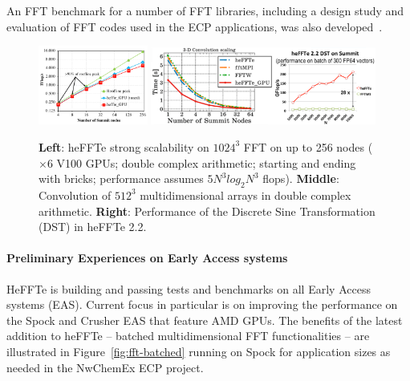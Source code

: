 An FFT benchmark for a number of FFT libraries, including a design study and evaluation of FFT 
codes used in the ECP applications, was also developed~\cite{fftbenchmark}.

\begin{figure}[htb]
   \centering
   \includegraphics[width=0.32\textwidth]{projects/2.3.3-MathLibs/2.3.3.13-CLOVER/heFFTeStrongScalability}
   \includegraphics[width=0.66\textwidth]{projects/2.3.3-MathLibs/2.3.3.13-CLOVER/heffte_conv_dst}
    \caption{\label{fig:fft-ecp-progress}
    {\bf Left}: heFFTe strong scalability on $1024^3$ 
                FFT on up to 256 nodes ($\times 6$ V100 GPUs;
                double complex arithmetic; starting and ending with bricks; 
                performance assumes $5 N^3 log_2 N^3$ flops).
    {\bf Middle}: Convolution of $512^3$ multidimensional arrays in double complex arithmetic.
    {\bf Right}: Performance of the Discrete Sine Transformation (DST) in heFFTe 2.2.
    }
\end{figure}

\paragraph{Preliminary Experiences on Early Access systems} 
HeFFTe is building and passing tests and benchmarks on all Early Access systems (EAS). 
Current focus in particular is on improving the performance on the Spock and Crusher EAS that
feature AMD GPUs. The benefits of the latest addition to heFFTe -- batched multidimensional 
FFT functionalities -- are illustrated in Figure~\ref{fig:fft-batched} running on Spock for application 
sizes as needed in the NwChemEx ECP project.

